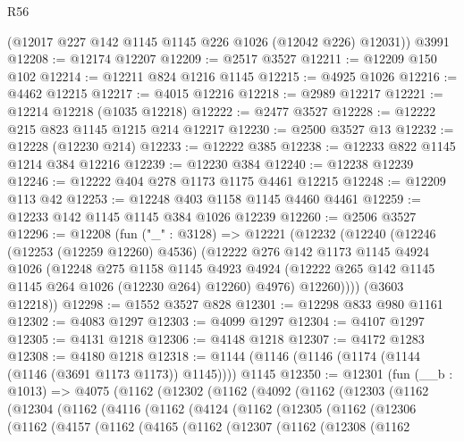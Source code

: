 \begin{lexlean}{R56}
\begin{coremodule}
      (@12017 @227 @142 @1145 @1145 @226 @1026 (@12042 @226) @12031))
    @3991
@12208 := @12174 @12207
@12209 := @2517 @3527
@12211 := @12209 @150 @102
@12214 := @12211 @824 @1216 @1145
@12215 := @4925 @1026
@12216 := @4462 @12215
@12217 := @4015 @12216
@12218 := @2989 @12217
@12221 := @12214 @12218 (@1035 @12218)
@12222 := @2477 @3527
@12228 := @12222 @215 @823 @1145 @1215 @214 @12217
@12230 := @2500 @3527 @13
@12232 := @12228 (@12230 @214)
@12233 := @12222 @385
@12238 := @12233 @822 @1145 @1214 @384 @12216
@12239 := @12230 @384
@12240 := @12238 @12239
@12246 := @12222 @404 @278 @1173 @1175 @4461 @12215
@12248 := @12209 @113 @42
@12253 := @12248 @403 @1158 @1145 @4460 @4461
@12259 := @12233 @142 @1145 @1145 @384 @1026 @12239
@12260 := @2506 @3527
@12296 := @12208
    (fun ("_" : @3128) =>
    @12221
      (@12232
        (@12240
          (@12246
            (@12253 (@12259 @12260) @4536)
            (@12222
              @276
              @142
              @1173
              @1145
              @4924
              @1026
              (@12248
                @275
                @1158
                @1145
                @4923
                @4924
                (@12222 @265 @142 @1145 @1145 @264 @1026 (@12230 @264) @12260)
                @4976)
              @12260))))
      (@3603 @12218))
@12298 := @1552 @3527 @828
@12301 := @12298 @833 @980 @1161
@12302 := @4083 @1297
@12303 := @4099 @1297
@12304 := @4107 @1297
@12305 := @4131 @1218
@12306 := @4148 @1218
@12307 := @4172 @1283
@12308 := @4180 @1218
@12318 := @1144 (@1146 (@1146 (@1174 (@1144 (@1146 (@3691 @1173 @1173)) @1145)))) @1145
@12350 := @12301
    (fun (__b : @1013) =>
    @4075
      (@1162
        (@12302
          (@1162
            (@4092
              (@1162
                (@12303
                  (@1162
                    (@12304
                      (@1162
                        (@4116
                          (@1162
                            (@4124
                              (@1162
                                (@12305
                                  (@1162
                                    (@12306
                                      (@1162
                                        (@4157
                                          (@1162
                                            (@4165
                                              (@1162
                                                (@12307
                                                  (@1162
                                                    (@12308
                                                      (@1162

\end{coremodule}
\end{lexlean}
